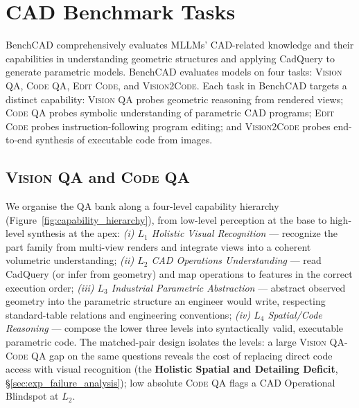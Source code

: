 \section{CAD Benchmark Tasks}
\label{sec:tasks}

BenchCAD comprehensively evaluates MLLMs’ CAD-related knowledge and their capabilities in understanding geometric structures and applying CadQuery to generate parametric models.
BenchCAD evaluates models on four tasks: \textsc{Vision QA}, \textsc{Code QA}, \textsc{Edit Code}, and \textsc{Vision2Code}.
Each task in BenchCAD targets a distinct capability: \textsc{Vision QA} probes geometric reasoning from rendered views;
\textsc{Code QA} probes symbolic understanding of parametric CAD programs; \textsc{Edit Code} probes instruction-following 
program editing; and \textsc{Vision2Code} probes end-to-end synthesis of executable code from images.  

\subsection{\textsc{Vision QA} and \textsc{Code QA}}
\label{sec:capability}


We organise the QA bank along a four-level capability hierarchy (Figure~\ref{fig:capability_hierarchy}), from low-level perception at the base to high-level synthesis at the apex:
 \emph{(i) $L_1$ Holistic Visual Recognition} --- recognize the part family from multi-view renders and integrate views into a coherent volumetric understanding; 
 \emph{(ii) $L_2$ CAD Operations Understanding} --- read CadQuery (or infer from geometry) and map operations to features in the correct execution order; 
 \emph{(iii) $L_3$ Industrial Parametric Abstraction} --- abstract observed geometry into the parametric structure an engineer would write, respecting standard-table relations and engineering conventions; 
 \emph{(iv) $L_4$ Spatial/Code Reasoning} --- compose the lower three levels into syntactically valid, executable parametric code. 
 The matched-pair design isolates the levels: a large \textsc{Vision QA}-\textsc{Code QA} gap on the same questions reveals the cost of replacing direct code access with visual recognition (the \textbf{Holistic Spatial and Detailing Deficit}, \S\ref{sec:exp_failure_analysis}); low absolute \textsc{Code QA} flags a CAD Operational Blindspot at $L_2$.

